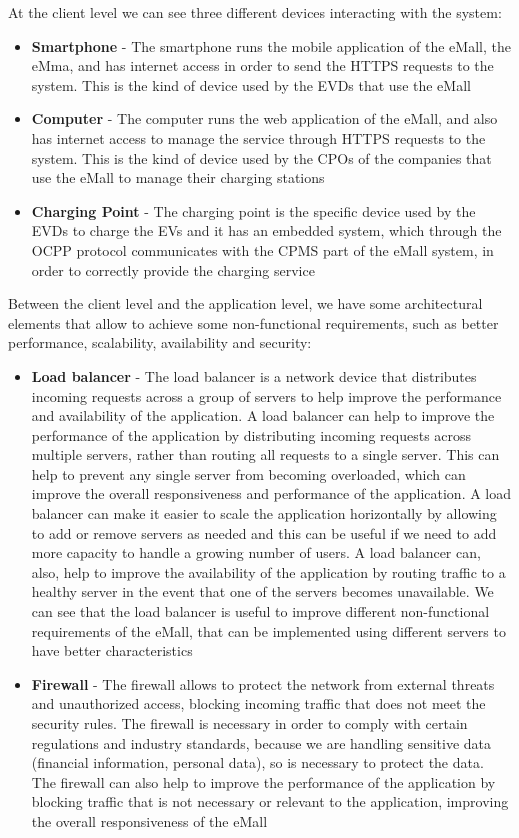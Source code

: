 At the client level we can see three different devices interacting with the system:
\begin{itemize}
    \item \textbf{Smartphone} - The smartphone runs the mobile application of the eMall, the eMma, and has internet access in order to send the HTTPS requests to the system. This is the kind of device used by the EVDs that use the eMall
    \item \textbf{Computer} - The computer runs the web application of the eMall, and also has internet access to manage the service through HTTPS requests to the system. This is the kind of device used by the CPOs of the companies that use the eMall to manage their charging stations
    \item \textbf{Charging Point} - The charging point is the specific device used by the EVDs to charge the EVs and it has an embedded system, which through the OCPP protocol communicates with the CPMS part of the eMall system, in order to correctly provide the charging service
\end{itemize}

Between the client level and the application level, we have some architectural elements that allow to achieve some non-functional requirements, such as better performance, scalability, availability and security:
\begin{itemize}
    \item \textbf{Load balancer} - The load balancer is a network device that distributes incoming requests across a group of servers to help improve the performance and availability of the application. A load balancer can help to improve the performance of the application by distributing incoming requests across multiple servers, rather than routing all requests to a single server. This can help to prevent any single server from becoming overloaded, which can improve the overall responsiveness and performance of the application. A load balancer can make it easier to scale the application horizontally by allowing to add or remove servers as needed and this can be useful if we need to add more capacity to handle a growing number of users. A load balancer can, also, help to improve the availability of the application by routing traffic to a healthy server in the event that one of the servers becomes unavailable. We can see that the load balancer is useful to improve different non-functional requirements of the eMall, that can be implemented using different servers to have better characteristics 
    \item \textbf{Firewall} - The firewall allows to protect the network from external threats and unauthorized access, blocking incoming traffic that does not meet the security rules. The firewall is necessary in order to comply with certain regulations and industry standards, because we are handling sensitive data (financial information, personal data), so is necessary to protect the data. The firewall can also help to improve the performance of the application by blocking traffic that is not necessary or relevant to the application, improving the overall responsiveness of the eMall
\end{itemize}

